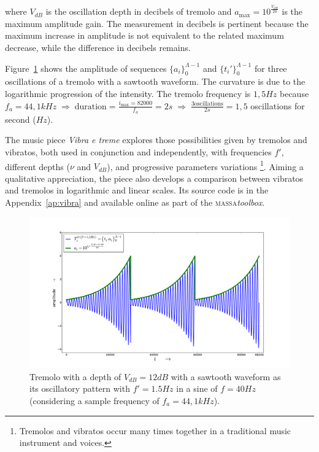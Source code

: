 \documentclass[
 aip,
 jmp,
 amsmath,amssymb,
 reprint,
]{revtex4-1}
\newcommand{\massa}{{\large \textsc{massa}}}
\begin{document}
\noindent where $V_{dB}$ is the oscillation depth in decibels of tremolo and $a_{\text{max}}=10^{\frac{V_{dB}}{20}}$ is the maximum amplitude gain.
The measurement in decibels is pertinent because the maximum increase in amplitude is not equivalent to the related maximum decrease, while the difference in decibels remains.

Figure~\ref{fig:tremolo} shows the amplitude of sequences $\{a_i\}_0^{\Lambda-1}$ and $\{t_i'\}_0^{\Lambda-1}$ for three oscillations of a tremolo with a sawtooth waveform. The curvature is due to the logarithmic progression of the intensity. The tremolo frequency is $1,5Hz$ because $f_a=44,1kHz \; \Rightarrow \; \text{duration} = \frac{i_{\text{max}}=82000}{f_a}= 2s \; \Rightarrow \; \frac{3\text{oscillations}}{2s}=1,5$ oscillations for second ($Hz$). 

The music piece \emph{Vibra e treme} explores those possibilities given by tremolos and vibratos, both used in conjunction and independently, with frequencies $f'$, different depths ($\nu$ and $V_{dB}$), and progressive parameters variations \footnote{Tremolos and vibratos occur many times together in a traditional music instrument and voices.}. Aiming a qualitative appreciation, the piece also develops a comparison between vibratos and tremolos in logarithmic and linear scales. Its source code is in the Appendix~\ref{ap:vibra} and available online as part of the \massa \emph{toolbox}.

\begin{figure}[h!]
     \centering
         \includegraphics[width=\columnwidth]{figures/tremolo}
     \caption{Tremolo with a depth of $V_{dB}=12dB$ with a sawtooth waveform as its oscillatory pattern with $f'=1.5Hz$ in a sine of $f=40Hz$ (considering a sample frequency of $f_a=44,1kHz$).}
         \label{fig:tremolo}
\end{figure}
\end{document}
